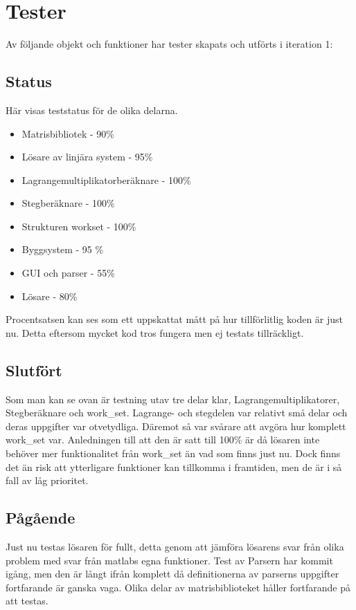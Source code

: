 \section{Tester}
Av följande objekt och funktioner har tester skapats och utförts i iteration 1:

\subsection{Status}
Här visas teststatus för de olika delarna.
\begin{itemize}
\item{Matrisbibliotek - 90\%}
\item{Lösare av linjära system - 95\%}
\item{Lagrangemultiplikatorberäknare - 100\%}
\item{Stegberäknare - 100\%}
\item{Strukturen work\underline{\space}set - 100\%}
\item{Byggsystem - 95 \%}
\item{GUI och parser - 55\%}
\item{Lösare - 80\%}
\end{itemize}
\raggedright Procentsatsen kan ses som ett uppskattat mått på hur tillförlitlig koden är just nu. Detta eftersom mycket kod tros fungera men ej testats tillräckligt. 

\newpage
\subsection{Slutfört}
Som man kan se ovan är testning utav tre delar klar, Lagrangemultiplikatorer, Stegberäknare och work\_set. Lagrange- och stegdelen var relativt små delar och deras uppgifter var otvetydliga. Däremot så var svårare att avgöra hur komplett work\_set var. Anledningen till att den är satt till 100\% är då lösaren inte behöver mer funktionalitet från work\_set än vad som finns just nu. Dock finns det än risk att ytterligare funktioner kan tillkomma i framtiden, men de är i så fall av låg prioritet. 

\subsection{Pågående}
Just nu testas lösaren för fullt, detta genom att jämföra lösarens svar från olika problem med svar från matlabs egna funktioner. \newline
Test av Parsern har kommit igång, men den är långt ifrån komplett då definitionerna av parserns uppgifter fortfarande är ganska vaga. \newline 
Olika delar av matrisbiblioteket håller fortfarande på att testas. 

